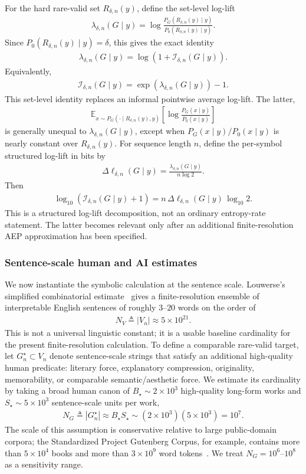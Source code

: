 \documentclass[
  aps,
  prresearch,
  reprint,
  amsmath,
  amssymb,
  superscriptaddress,
  nofootinbib,
  longbibliography
]{revtex4-2}
\def\EQSP{3pt}
\newcommand{\cgather}[2][\EQSP]{\begingroup\setlength\abovedisplayskip{#1}\setlength\belowdisplayskip{#1}\begin{gather} #2 \end{gather}\endgroup\noindent}
\newcommand{\Exp}{\mathbb{E}}
\newcommand{\calI}{\mathcal{I}}
\begin{document}
For the hard rare-valid set \(R_{\delta,n}(y)\), define the set-level log-lift
\cgather{
    \lambda_{\delta,n}(G\mid y)
    =
    \log
    \frac{
    P_G(R_{\delta,n}(y)\mid y)
    }
    {
    P_0(R_{\delta,n}(y)\mid y)
    }.
}
Since \(P_0(R_{\delta,n}(y)\mid y)=\delta\), this gives the exact identity
\cgather{
    \lambda_{\delta,n}(G\mid y)
    =
    \log\left(1+\calI_{\delta,n}(G\mid y)\right).
    \label{eq:set_lift_identity}
}
Equivalently,
\cgather{
    \calI_{\delta,n}(G\mid y)
    =
    \exp\left(\lambda_{\delta,n}(G\mid y)\right)-1.
    \label{eq:I_from_set_lift}
}
This set-level identity replaces an informal pointwise average log-lift. The latter,
\cgather{
    \Exp_{x\sim P_G(\cdot\mid R_{\delta,n}(y),y)}
    \left[
    \log
    \frac{P_G(x\mid y)}{P_0(x\mid y)}
    \right]
}
is generally unequal to \(\lambda_{\delta,n}(G\mid y)\), except when \(P_G(x\mid y)/P_0(x\mid y)\) is nearly constant over \(R_{\delta,n}(y)\). For sequence length \(n\), define the per-symbol structured log-lift in bits by
\cgather{
    \Delta\ell_{\delta,n}(G\mid y)
    =
    \frac{
    \lambda_{\delta,n}(G\mid y)
    }
    {n\log 2}.
    \label{eq:structured_log_lift}
}
Then
\cgather{
    \log_{10}\left(\calI_{\delta,n}(G\mid y)+1\right)
    =
    n\,\Delta\ell_{\delta,n}(G\mid y)\,\log_{10}2.
    \label{eq:symbolic_logI}
}
This is a structured log-lift decomposition, not an ordinary entropy-rate statement. The latter becomes relevant only after an additional finite-resolution AEP approximation has been specified.

\subsubsection{Sentence-scale human and AI estimates}
\label{sec:symbolic_human_ai_estimates}

We now instantiate the symbolic calculation at the sentence scale. Louwerse's simplified combinatorial estimate~\citep{louwerse2021sentences} gives a finite-resolution ensemble of interpretable English sentences of roughly \(3\)--\(20\) words on the order of
\cgather{
    N_V\triangleq |V_n|\approx 5\times10^{21}.
    \label{eq:valid_sentence_count}
}
This is not a universal linguistic constant; it is a usable baseline cardinality for the present finite-resolution calculation. To define a comparable rare-valid target, let \(G_n^\star\subset V_n\) denote sentence-scale strings that satisfy an additional high-quality human predicate: literary force, explanatory compression, originality, memorability, or comparable semantic/aesthetic force. We estimate its cardinality by taking a broad human canon of \(B_\star\sim2\times10^3\) high-quality long-form works and \(S_\star\sim5\times10^3\) sentence-scale units per work,
\cgather{
    N_G\triangleq |G_n^\star|
    \approx
    B_\star S_\star
    \sim
    (2\times10^3)(5\times10^3)
    =
    10^7.
    \label{eq:great_sentence_count}
}
The scale of this assumption is conservative relative to large public-domain corpora; the Standardized Project Gutenberg Corpus, for example, contains more than \(5\times10^4\) books and more than \(3\times10^9\) word tokens~\citep{gerlach2020standardized}. We treat \(N_G=10^6\)--\(10^8\) as a sensitivity range.
\end{document}
